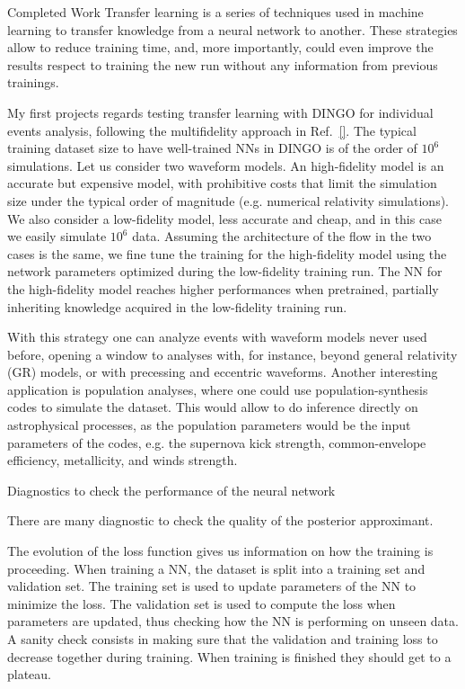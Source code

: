 \documentclass[a4paper, 12pt, twoside, openright, titlepage]{book}
\begin{document}
\begin{chapter}{Completed Work}
Transfer learning is a series of techniques used in machine learning to transfer knowledge from a neural network to another.
These strategies allow to reduce training time, and, more importantly, could even improve the results respect to training the new run without any information from previous trainings. 

My first projects regards testing transfer learning with DINGO for individual events analysis, following the multifidelity approach in Ref.~\ref{}.
The typical training dataset size to have well-trained NNs in DINGO is of the order of $10^{6}$ simulations.
Let us consider two waveform models.
An high-fidelity model is an accurate but expensive model, with prohibitive costs that limit the simulation size under the typical order of magnitude (e.g. numerical relativity simulations).
We also consider a low-fidelity model, less accurate and cheap, and in this case we easily simulate $10^{6}$ data.
Assuming the architecture of the flow in the two cases is the same, we fine tune the training for the high-fidelity model using the network parameters optimized during the low-fidelity training run.
The NN for the high-fidelity model reaches higher performances when pretrained, partially inheriting knowledge acquired in the low-fidelity training run.

With this strategy one can analyze events with waveform models never used before, opening a window to analyses with, for instance, beyond general relativity (GR) models, or with precessing and eccentric waveforms.
Another interesting application is population analyses, where one could use population-synthesis codes to simulate the dataset. 
This would allow to do inference directly on astrophysical processes, as the population parameters would be the input parameters of the codes, e.g. the supernova kick strength, common-envelope efficiency, metallicity, and winds strength.


\begin{section}{Diagnostics to check the performance of the neural network}

There are many diagnostic to check the quality of the posterior approximant.

The evolution of the loss function gives us information on how the training is proceeding.
When training a NN, the dataset is split into a training set and validation set. 
The training set is used to update parameters of the NN to minimize the loss.
The validation set is used to compute the loss when parameters are updated, thus checking how the NN is performing on unseen data.
A sanity check consists in making sure that the validation and training loss to decrease together during training.
When training is finished they should get to a plateau.


\end{section}
\end{chapter}
\end{document}
